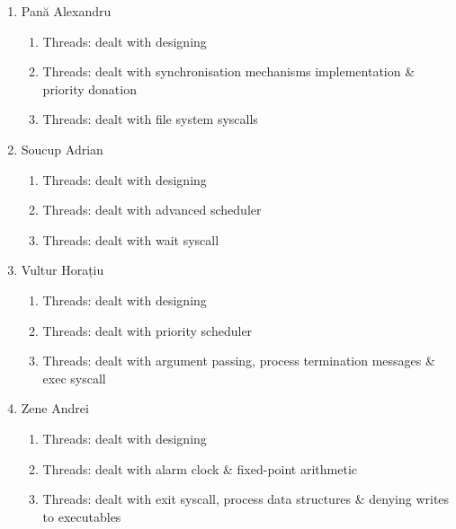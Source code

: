 \documentclass[a4paper,12pt]{report}
\begin{document}
\begin{enumerate}
	\item Pană Alexandru
	    \begin{enumerate}
	     \item Threads: dealt with designing
	     \item Threads: dealt with synchronisation mechanisms implementation \& priority donation
	     \item Threads: dealt with file system syscalls
	    \end{enumerate}

	\item Soucup Adrian
	    \begin{enumerate}
	     \item Threads: dealt with designing
	     \item Threads: dealt with advanced scheduler
	     \item Threads: dealt with wait syscall
	    \end{enumerate}
	    
	\item Vultur Horațiu
	    \begin{enumerate}
	     \item Threads: dealt with designing
	     \item Threads: dealt with priority scheduler
	     \item Threads: dealt with argument passing, process termination messages \& exec syscall
	    \end{enumerate}

	\item Zene Andrei
	    \begin{enumerate}
	     \item Threads: dealt with designing
	     \item Threads: dealt with alarm clock \& fixed-point arithmetic
	     \item Threads: dealt with exit syscall, process data structures \& denying writes to executables
	    \end{enumerate}
	   
\end{enumerate}











\end{document}
